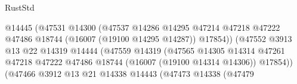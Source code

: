 \begin{lexlean}{RustStd}
\begin{coremodule}
                                                      @14445
                                                      (@47531
                                                        @14300
                                                        (@47537
                                                          @14286
                                                          @14295
                                                          @47214
                                                          @47218
                                                          @47222
                                                          @47486
                                                          @18744
                                                          (@16007 (@19100 @14295 @14287))
                                                          @17854))
                                                      (@47552
                                                        @3913
                                                        @13
                                                        @22
                                                        @14319
                                                        @14444
                                                        (@47559
                                                          @14319
                                                          (@47565
                                                            @14305
                                                            @14314
                                                            @47261
                                                            @47218
                                                            @47222
                                                            @47486
                                                            @18744
                                                            (@16007 (@19100 @14314 @14306))
                                                            @17854))
                                                        (@47466
                                                          @3912
                                                          @13
                                                          @21
                                                          @14338
                                                          @14443
                                                          (@47473
                                                            @14338
                                                            (@47479

\end{coremodule}
\end{lexlean}
